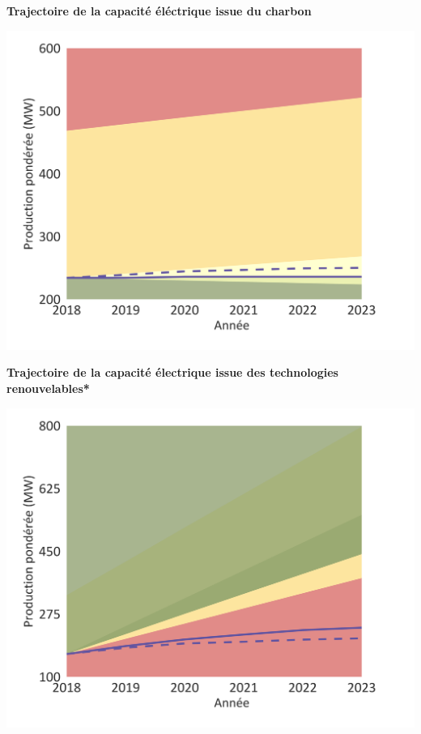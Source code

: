 \documentclass[10pt,table,a4]{article}\usepackage[]{graphicx}\usepackage[]{color}
\begin{document}
	\begin{minipage}[t]{.49\linewidth}
		\begin{center}
		\textbf{Trajectoire de la capacité éléctrique issue du charbon}
		\end{center}
		\includegraphics[trim = {0 0cm 0 0},width=1\linewidth]{ReportOutputs/Fig07}
		\vspace{-0.4cm}
		\begin{center}
		\textbf{Trajectoire de la capacité électrique issue des technologies renouvelables*}
		\end{center}
		\includegraphics[trim = {0 0cm 0 0},width=.99\linewidth]{ReportOutputs/Fig08}
	\end{minipage}	
\end{document}
